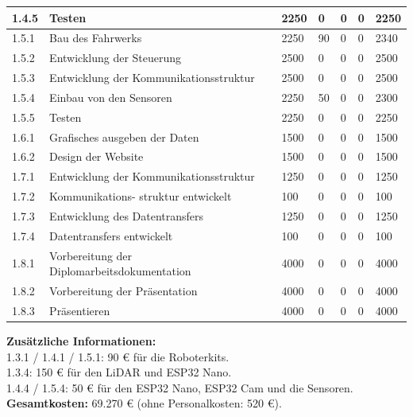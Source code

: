 \begin{longtable}[c]{|p{}|p{3cm}|p{}|p{}|p{2cm}|p{}|p{}|}
\hline
1.4.5 & Testen & 2250 & 0 & 0 & 0 & 2250 \\
\hline
1.5.1 & Bau des Fahrwerks & 2250 & 90 & 0 & 0 & 2340 \\
\hline
1.5.2 & Entwicklung der Steuerung & 2500 & 0 & 0 & 0 & 2500 \\
\hline
1.5.3 & Entwicklung der Kommunikationsstruktur & 2500 & 0 & 0 & 0 & 2500 \\
\hline
1.5.4 & Einbau von den Sensoren & 2250 & 50 & 0 & 0 & 2300 \\
\hline
1.5.5 & Testen & 2250 & 0 & 0 & 0 & 2250 \\
\hline
1.6.1 & Grafisches ausgeben der Daten & 1500 & 0 & 0 & 0 & 1500 \\
\hline
1.6.2 & Design der Website & 1500 & 0 & 0 & 0 & 1500 \\
\hline
1.7.1 & Entwicklung der Kommunikationsstruktur & 1250 & 0 & 0 & 0 & 1250 \\
\hline
1.7.2 & Kommunikations-  struktur entwickelt & 100 & 0 & 0 & 0 & 100 \\
\hline
1.7.3 & Entwicklung des Datentransfers & 1250 & 0 & 0 & 0 & 1250 \\
\hline
1.7.4 & Datentransfers entwickelt & 100 & 0 & 0 & 0 & 100 \\
\hline
1.8.1 & Vorbereitung der Diplomarbeitsdokumentation & 4000 & 0 & 0 & 0 & 4000 \\
\hline
1.8.2 & Vorbereitung der Präsentation & 4000 & 0 & 0 & 0 & 4000 \\
\hline
1.8.3 & Präsentieren & 4000 & 0 & 0 & 0 & 4000 \\
\hline
\end{longtable}

\textbf{Zusätzliche Informationen:} \\
1.3.1 / 1.4.1 / 1.5.1: 90 € für die Roboterkits. \\
1.3.4: 150 € für den LiDAR und ESP32 Nano. \\
1.4.4 / 1.5.4: 50 € für den ESP32 Nano, ESP32 Cam und die Sensoren. \\

\textbf{Gesamtkosten:} 69.270 € (ohne Personalkosten: 520 €).

% 
